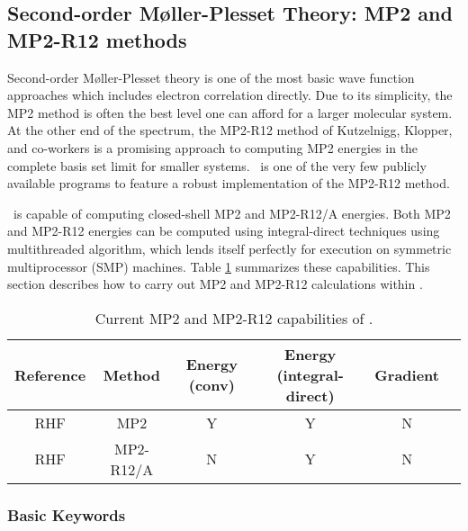 \subsection{Second-order M\o ller-Plesset Theory: MP2 and MP2-R12 methods} \label{mp2}

Second-order M\o ller-Plesset theory is one of the most basic wave
function approaches which includes electron correlation
directly.
Due to its simplicity, the MP2 method is often the best
level one can afford for a larger molecular system.
At the other end of the spectrum, the MP2-R12 method
of Kutzelnigg, Klopper, and co-workers is a promising
approach to computing MP2 energies in the complete
basis set limit for smaller systems. \PSIthree\ is
one of the very few publicly available programs to
feature a robust implementation of the MP2-R12 method.


\PSIthree\ is capable of computing closed-shell
MP2 and MP2-R12/A energies. Both MP2 and MP2-R12 energies can be computed
using integral-direct techniques using multithreaded algorithm,
which lends itself perfectly for execution on symmetric multiprocessor (SMP)
machines.
Table \ref{table:mp2summary} summarizes these capabilities.  This section
describes how to carry out MP2 and MP2-R12 calculations within \PSIthree.
\begin{table}[h]
\begin{center}
\begin{tabular}{cccccc}
\hline
\hline
Reference & Method & Energy (conv) & Energy (integral-direct) & Gradient  \\
\hline
RHF       & MP2    & Y & Y & N \\
RHF       & MP2-R12/A & N & Y & N \\
\hline
\hline
\end{tabular}
\end{center}
\caption{Current MP2 and MP2-R12 capabilities of \PSIthree.}
\label{table:mp2summary}
\end{table}

\subsubsection{Basic Keywords}

